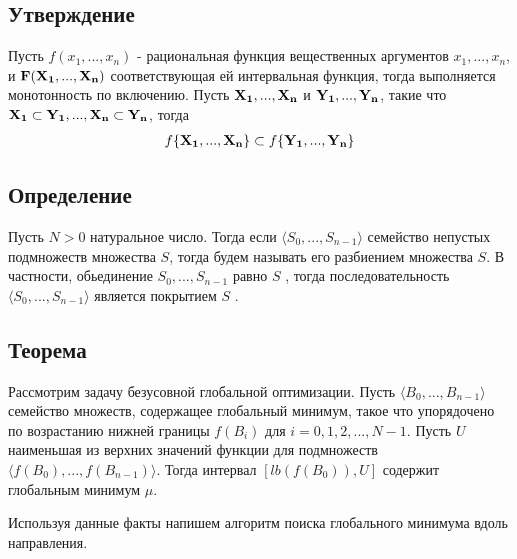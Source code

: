 \documentclass{article}
\begin{document}
    \subsection{Утверждение}

    Пусть $f(x_1, ..., x_n)$ - рациональная функция вещественных аргументов $x_1, ..., x_n$, и $\bold{F(X_1, ..., X_n)}$ соответствующая ей интервальная функция, тогда выполняется монотонность по включению.
    Пусть $\bold{X_1},...,\bold{X_n}$ и $\bold{Y_1},...,\bold{Y_n}$, такие что $\bold{X_1} \subset \bold{Y_1},...,\bold{X_n} \subset \bold{Y_n}$, тогда
    \begin{gather*}
        f\{\bold{X_1},...,\bold{X_n}\} \subset f\{\bold{Y_1},...,\bold{Y_n}\}
    \end{gather*}

    \subsection{Определение}

    Пусть $N > 0$  натуральное число. Тогда если $\langle S_0,..., S_{n-1} \rangle$ семейство непустых подмножеств множества $S$, тогда будем называть его разбиением множества $S$. В частности, обьединение $S_0,..., S_{n-1}$ равно $S$ , тогда последовательность $\langle S_0,..., S_{n-1} \rangle$ является покрытием $S$ .

    \subsection{Теорема}

    Рассмотрим задачу безусовной глобальной оптимизации. Пусть $\langle B_0,..., B_{n-1} \rangle$ семейство множеств, содержащее глобальный минимум, такое что упорядочено по возрастанию нижней границы $f(B_i)$ для $i=0, 1, 2,..., N-1$. Пусть $U$ наименьшая из верхних значений функции для подмножеств $\langle f(B_0),..., f(B_{n-1}) \rangle$. Тогда интервал $[lb(f(B_0)), U]$ содержит глобальным минимум $\mu$.


    Используя данные факты напишем алгоритм поиска глобального минимума вдоль направления.
\end{document}
